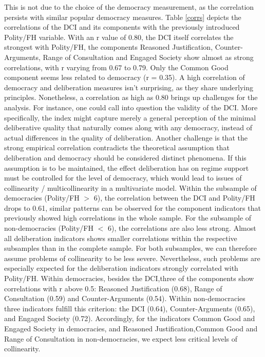 \documentclass[]{article}
\begin{document}
This is not due to the choice of the democracy measurement, as the
correlation persists with similar popular democracy measures. Table
\ref{corrs} depicts the correlations of the DCI and its components with
the previously introduced Polity/FH variable. With an r value of 0.80,
the DCI itself correlates the strongest with Polity/FH, the components
Reasoned Justification, Counter-Arguments, Range of Consultation and
Engaged Society show almost as strong correlations, with r varying from
0.67 to 0.79. Only the Common Good component seems less related to
democracy (r = 0.35). A high correlation of democracy and deliberation
measures isn't surprising, as they share underlying principles.
Nonetheless, a correlation as high as 0.80 brings up challenges for the
analysis. For instance, one could call into question the validity of the
DCI. More specifically, the index might capture merely a general
perception of the minimal deliberative quality that naturally comes
along with any democracy, instead of actual differences in the quality
of deliberation. Another challenge is that the strong empirical
correlation contradicts the theoretical assumption that deliberation and
democracy should be considered distinct phenomena. If this assumption is
to be maintained, the effect deliberation has on regime support must be
controlled for the level of democracy, which would lead to issues of
collinearity / multicollinearity in a multivariate model. Within the
subsample of democracies (Polity/FH \(>\) 6), the correlation between
the DCI and Polity/FH drops to 0.61, similar patterns can be observed
for the component indicators that previously showed high correlations in
the whole sample. For the subsample of non-democracies (Polity/FH \(<\)
6), the correlations are also less strong. Almost all deliberation
indicators shows smaller correlations within the respective subsamples
than in the complete sample. For both subsamples, we can therefore
assume problems of collinearity to be less severe. Nevertheless, such
problems are especially expected for the deliberation indicators
strongly correlated with Polity/FH. Within democracies, besides the
DCI,three of the components show correlations with r above 0.5: Reasoned
Justification (0.68), Range of Consultation (0.59) and Counter-Arguments
(0.54). Within non-democracies three indicators fulfill this criterion:
the DCI (0.64), Counter-Arguments (0.65), and Engaged Society (0.72).
Accordingly, for the indicators Common Good and Engaged Society in
democracies, and Reasoned Justification,Common Good and Range of
Consultation in non-democracies, we expect less critical levels of
collinearity.
\end{document}
